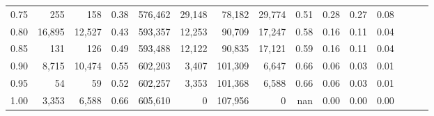 \begin{tabular}{rrrrrrrrrrrrrrr}
0.75 &     255 &     158 &  0.38 &  576,462 &   29,148 &   78,182 &   29,774 &  0.51 &  0.28 &  0.27 &      0.08 \\
0.80 &  16,895 &  12,527 &  0.43 &  593,357 &   12,253 &   90,709 &   17,247 &  0.58 &  0.16 &  0.11 &      0.04 \\
0.85 &     131 &     126 &  0.49 &  593,488 &   12,122 &   90,835 &   17,121 &  0.59 &  0.16 &  0.11 &      0.04 \\
0.90 &   8,715 &  10,474 &  0.55 &  602,203 &    3,407 &  101,309 &    6,647 &  0.66 &  0.06 &  0.03 &      0.01 \\
0.95 &      54 &      59 &  0.52 &  602,257 &    3,353 &  101,368 &    6,588 &  0.66 &  0.06 &  0.03 &      0.01 \\
1.00 &   3,353 &   6,588 &  0.66 &  605,610 &        0 &  107,956 &        0 &   nan &  0.00 &  0.00 &      0.00 \\
\bottomrule
\end{tabular}

